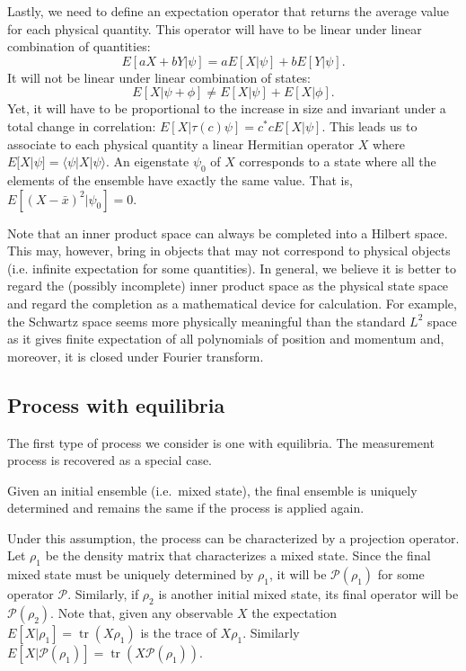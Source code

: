 \documentclass[11pt,letterpaper,fleqn]{memoir} %
\DeclareMathOperator{\tr}{tr}
\begin{document}
Lastly, we need to define an expectation operator that returns the average value for each physical quantity. This operator will have to be linear under linear combination of quantities:
\begin{equation}
E[aX + bY | \psi] = aE[X | \psi] + bE[Y | \psi].
\end{equation}
It will not be linear under linear combination of states:
\begin{equation}
E[X | \psi + \phi] \neq E[X | \psi] + E[X | \phi].
\end{equation}
Yet, it will have to be proportional to the increase in size and invariant under a total change in correlation: $E[X | \tau(c) \psi] = c^*c E[X | \psi]$. This leads us to associate to each physical quantity a linear Hermitian operator $X$ where $E[X | \psi] = \langle \psi | X | \psi \rangle$. An eigenstate $\psi_0$ of $X$ corresponds to a state where all the elements of the ensemble have exactly the same value. That is, $E[(X - \bar{x})^2 | \psi_0] = 0$.

Note that an inner product space can always be completed into a Hilbert space. This may, however, bring in objects that may not correspond to physical objects (i.e. infinite expectation for some quantities). In general, we believe it is better to regard the (possibly incomplete) inner product space as the physical state space and regard the completion as a mathematical device for calculation. For example, the Schwartz space seems more physically meaningful than the standard $L^2$ space as it gives finite expectation of all polynomials of position and momentum and, moreover, it is closed under Fourier transform.

\subsection{Process with equilibria}

The first type of process we consider is one with equilibria. The measurement process is recovered as a special case.

\begin{assump}
	Given an initial ensemble (i.e.~mixed state), the final ensemble is uniquely determined and remains the same if the process is applied again.
\end{assump}

Under this assumption, the process can be characterized by a projection operator. Let $\rho_1$ be the density matrix that characterizes a mixed state. Since the final mixed state must be uniquely determined by $\rho_1$, it will be $\mathcal{P}(\rho_1)$ for some operator $\mathcal{P}$. Similarly, if $\rho_2$ is another initial mixed state, its final operator will be $\mathcal{P}(\rho_2)$. Note that, given any observable $X$ the expectation $E[X|\rho_1] = \tr(X\rho_1)$ is the trace of $X\rho_1$. Similarly $E[X|\mathcal{P}(\rho_1)] = \tr(X \mathcal{P}(\rho_1))$.
\end{document}
